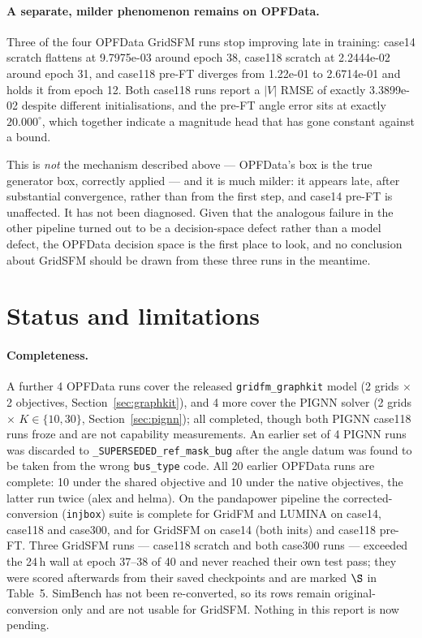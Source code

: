 \documentclass[10pt]{article}
\begin{document}
\paragraph{A separate, milder phenomenon remains on OPFData.} Three of the four
OPFData GridSFM runs stop improving late in training: case14 scratch flattens at
9.7975e-03 around epoch 38, case118 scratch at 2.2444e-02 around epoch 31, and
case118 pre-FT diverges from 1.22e-01 to 2.6714e-01 and holds it from epoch 12.
Both case118 runs report a \(|V|\) RMSE of exactly 3.3899e-02 despite different
initialisations, and the pre-FT angle error sits at exactly \(20.000^\circ\),
which together indicate a magnitude head that has gone constant against a bound.

This is \emph{not} the mechanism described above --- OPFData's box is the true
generator box, correctly applied --- and it is much milder: it appears late,
after substantial convergence, rather than from the first step, and case14 pre-FT
is unaffected. It has not been diagnosed. Given that the analogous failure in the
other pipeline turned out to be a decision-space defect rather than a model
defect, the OPFData decision space is the first place to look, and no conclusion
about GridSFM should be drawn from these three runs in the meantime.

\section{Status and limitations}

\paragraph{Completeness.} A further 4 OPFData runs cover the released
\texttt{gridfm\_graphkit} model (2 grids \(\times\) 2 objectives,
Section~\ref{sec:graphkit}), and 4 more cover the PIGNN solver (2 grids
\(\times\) \(K \in \{10,30\}\), Section~\ref{sec:pignn}); all completed,
though both PIGNN case118 runs froze and are not capability measurements. An
earlier set of 4 PIGNN runs was discarded to
\texttt{\_SUPERSEDED\_ref\_mask\_bug} after the angle datum was found to be
taken from the wrong \texttt{bus\_type} code. All 20 earlier OPFData runs are
complete: 10 under the shared
objective and 10 under the native objectives, the latter run twice (alex and
helma). On the pandapower pipeline the corrected-conversion (\texttt{injbox})
suite is complete for GridFM and LUMINA on case14, case118 and case300, and for
GridSFM on case14 (both inits) and case118 pre-FT. Three GridSFM runs ---
case118 scratch and both case300 runs --- exceeded the 24\,h wall at epoch
37--38 of 40 and never reached their own test pass; they were scored afterwards
from their saved checkpoints and are marked \(\S\) in Table~5. SimBench has not
been re-converted, so its rows remain original-conversion only and are not
usable for GridSFM. Nothing in this report is now pending.
\end{document}
